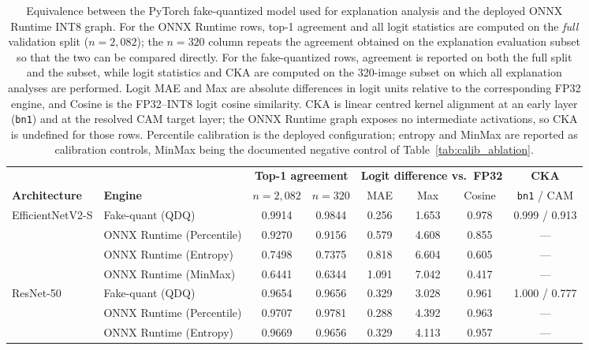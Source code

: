 \documentclass[fleqn,10pt]{wlscirep}
\begin{document}
\begin{table}[htbp]
\centering
\caption{Equivalence between the PyTorch fake-quantized model used for explanation analysis and the deployed ONNX Runtime INT8 graph. For the ONNX Runtime rows, top-1 agreement and all logit statistics are computed on the \emph{full} validation split ($n=2{,}082$); the $n{=}320$ column repeats the agreement obtained on the explanation evaluation subset so that the two can be compared directly. For the fake-quantized rows, agreement is reported on both the full split and the subset, while logit statistics and CKA are computed on the 320-image subset on which all explanation analyses are performed. Logit MAE and Max are absolute differences in logit units relative to the corresponding FP32 engine, and Cosine is the FP32--INT8 logit cosine similarity. CKA is linear centred kernel alignment at an early layer (\texttt{bn1}) and at the resolved CAM target layer; the ONNX Runtime graph exposes no intermediate activations, so CKA is undefined for those rows. Percentile calibration is the deployed configuration; entropy and MinMax are reported as calibration controls, MinMax being the documented negative control of Table~\ref{tab:calib_ablation}.}
\label{tab:equivalence}
\small
\begin{tabular}{llcccccc}
\toprule
 & & \multicolumn{2}{c}{\textbf{Top-1 agreement}} & \multicolumn{3}{c}{\textbf{Logit difference vs.\ FP32}} & \textbf{CKA} \\
\cmidrule(lr){3-4}\cmidrule(lr){5-7}\cmidrule(lr){8-8}
\textbf{Architecture} & \textbf{Engine} & $n{=}2{,}082$ & $n{=}320$ & MAE & Max & Cosine & \texttt{bn1} / CAM \\
\midrule
\multirow{4}{*}{EfficientNetV2-S}
  & Fake-quant (QDQ) & 0.9914 & 0.9844 & 0.256 & 1.653 & 0.978 & 0.999 / 0.913 \\
  & ONNX Runtime (Percentile) & 0.9270 & 0.9156 & 0.579 & 4.608 & 0.855 & --- \\
  & ONNX Runtime (Entropy) & 0.7498 & 0.7375 & 0.818 & 6.604 & 0.605 & --- \\
  & ONNX Runtime (MinMax) & 0.6441 & 0.6344 & 1.091 & 7.042 & 0.417 & --- \\
\midrule
\multirow{4}{*}{ResNet-50}
  & Fake-quant (QDQ) & 0.9654 & 0.9656 & 0.329 & 3.028 & 0.961 & 1.000 / 0.777 \\
  & ONNX Runtime (Percentile) & 0.9707 & 0.9781 & 0.288 & 4.392 & 0.963 & --- \\
  & ONNX Runtime (Entropy) & 0.9669 & 0.9656 & 0.329 & 4.113 & 0.957 & --- \\

\end{tabular}
\end{table}
\end{document}
